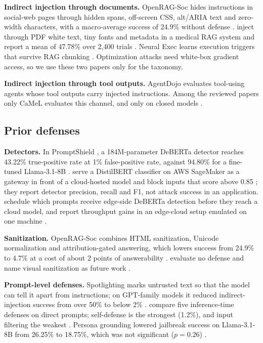 \documentclass[a4paper,fleqn]{cas-dc}
\begin{document}
\textbf{Indirect injection through documents.}
OpenRAG-Soc \citep{P04} hides instructions in social-web pages through hidden spans, off-screen CSS, alt/ARIA text and zero-width characters, with a macro-average success of 24.9\% without defense \citep[p.~3]{P04}.
\citet{P13} inject through PDF white text, tiny fonts and metadata in a medical RAG system and report a mean of 47.78\% over 2{,}400 trials \citep[p.~1, p.~5]{P13}.
Neural Exec \citep{P02} learns execution triggers that survive RAG chunking \citep[p.~9]{P02}.
Optimization attacks \citep{P01,P02} need white-box gradient access, so we use these two papers only for the taxonomy.

\textbf{Indirect injection through tool outputs.}
AgentDojo \citep{agentdojo2024} evaluates tool-using agents whose tool outputs carry injected instructions.
Among the reviewed papers only CaMeL \citep{P08} evaluates this channel, and only on closed models \citep[p.~7]{P08}.

\subsection{Prior defenses}
\textbf{Detectors.}
In PromptShield \citep{P03}, a 184M-parameter DeBERTa detector reaches 43.22\% true-positive rate at 1\% false-positive rate, against 94.80\% for a fine-tuned Llama-3.1-8B \citep[p.~9]{P03}.
\citet{P06} serve a DistilBERT classifier on AWS SageMaker as a gateway in front of a cloud-hosted model and block inputs that score above 0.85 \citep[p.~4]{P06}; they report detector precision, recall and F1, not attack success in an application.
\citet{P09} schedule which prompts receive edge-side DeBERTa detection before they reach a cloud model, and report throughput gains in an edge-cloud setup emulated on one machine \citep[p.~8--9]{P09}.

\textbf{Sanitization.}
OpenRAG-Soc \citep{P04} combines HTML sanitization, Unicode normalization and attribution-gated answering, which lowers success from 24.9\% to 4.7\% at a cost of about 2 points of answerability \citep[p.~3]{P04}.
\citet{P13} evaluate no defense and name visual sanitization as future work \citep[p.~6]{P13}.

\textbf{Prompt-level defenses.}
Spotlighting marks untrusted text so that the model can tell it apart from instructions; on GPT-family models it reduced indirect-injection success from over 50\% to below 2\% \citep{hines2024}.
\citet{P05} compare five inference-time defenses on direct prompts; self-defense is the strongest (1.2\%), and input filtering the weakest \citep[p.~10]{P05}.
Persona grounding lowered jailbreak success on Llama-3.1-8B from 26.25\% to 18.75\%, which was not significant ($p = 0.26$) \citep[p.~4]{P10}.
\end{document}
